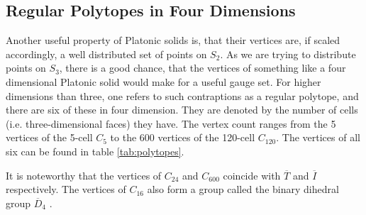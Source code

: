 \subsection{Regular Polytopes in Four Dimensions}

Another useful property of Platonic solids is, that their vertices are, if scaled accordingly, a well distributed set of points on $S_2$. As we are trying to distribute points on $S_3$, there is a good chance, that the vertices of something like a four dimensional Platonic solid would make for a useful gauge set. For higher dimensions than three, one refers to such contraptions as a regular polytope, and there are six of these in four dimension. They are denoted by the number of cells (i.e. three-dimensional faces) they have. The vertex count ranges from the 5 vertices of the 5-cell $C_5$ to the 600 vertices of the 120-cell $C_{120}$. The vertices of all six can be found in table \ref{tab:polytopes}.

It is noteworthy that the vertices of $C_{24}$ and  $C_{600}$ coincide with $\overline{T}$ and $\overline{I}$ respectively. The vertices of $C_{16}$ also form a group called the binary dihedral group $\overline{D}_4$ \cite{duval:1964}.

